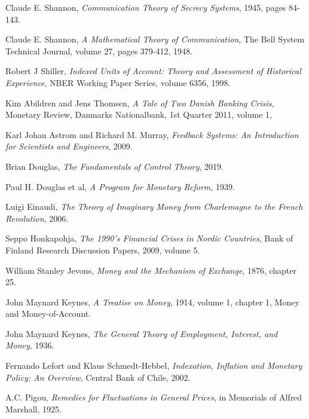 \begin{thebibliography}{9}
    Claude E. Shannon,
    \emph{Communication Theory of Secrecy Systems},
    1945,
    pages 84-143.

    Claude E. Shannon,
    \emph{A Mathematical Theory of Communication},
    The Bell System Technical Journal,
    volume 27,
    pages 379-412,
    1948.

    Robert J Shiller,
    \emph{Indexed Units of Account: Theory and Assessment of Historical Experience},
    NBER Working Paper Series,
    volume 6356,
    1998.

    Kim Abildren and Jens Thomsen,
    \emph{A Tale of Two Danish Banking Crisis},
    Monetary Review,
    Danmarks Nationalbank,
    1st Quarter 2011,
    volume 1,

    Karl Johan Astrom and Richard M. Murray,
    \emph{Feedback Systems: An Introduction for Scientists and Engineers},
    2009.

    Brian Douglas,
    \emph{The Fundamentals of Control Theory},
    2019.

    Paul H. Douglas et al,
    \emph{A Program for Monetary Reform},
    1939.

    Luigi Einaudi,
    \emph{The Theory of Imaginary Money from Charlemagne to the French Revolution},
    2006.

    Seppo Honkapohja,
    \emph{The 1990's Financial Crises in Nordic Countries},
    Bank of Finland Research Discussion Papers,
    2009,
    volume 5.

    William Stanley Jevons,
    \emph{Money and the Mechanism of Exchange},
    1876,
    chapter 25.

    John Maynard Keynes,
    \emph{A Treatise on Money},
    1914,
    volume 1,
    chapter 1,
    Money and Money-of-Account.

    John Maynard Keynes,
    \emph{The General Theory of Employment, Interest, and Money},
    1936.

    Fernando Lefort and Klaus Schmedt-Hebbel,
    \emph{Indexation, Inflation and Monetary Policy: An Overview},
    Central Bank of Chile,
    2002.

    A.C. Pigou,
    \emph{Remedies for Fluctuations in General Prices},
    in Memorials of Alfred Marshall,
    1925.


\end{thebibliography}
